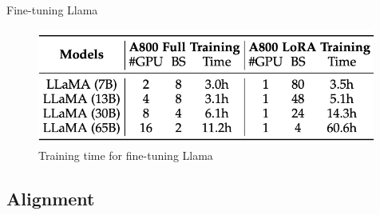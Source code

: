 \documentclass[10pt]{beamer}
\begin{document}

\begin{frame}{Fine-tuning Llama}

\begin{figure}[h]
\centering
\includegraphics[width=0.99\textwidth]{fig/zhao_2023_tab7}
\caption{Training time for fine-tuning Llama}
\end{figure}

\end{frame}


\subsection{Alignment}
\end{document}
